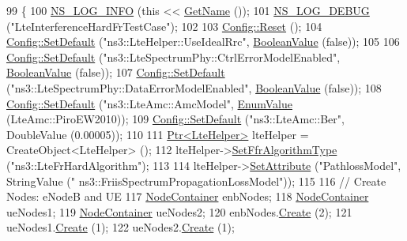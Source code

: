 \begin{DoxyCode}
99 \{
100   \hyperlink{group__logging_gafbd73ee2cf9f26b319f49086d8e860fb}{NS\_LOG\_INFO} (\textcolor{keyword}{this} << \hyperlink{classns3_1_1TestCase_a28f7bb59669c24dae1c290fc17fc9b62}{GetName} ());
101   \hyperlink{group__logging_ga413f1886406d49f59a6a0a89b77b4d0a}{NS\_LOG\_DEBUG} (\textcolor{stringliteral}{"LteInterferenceHardFrTestCase"});
102 
103   \hyperlink{group__config_ga2c1b65724f42f8c72276d7e7ad6df6db}{Config::Reset} ();
104   \hyperlink{group__config_ga2e7882df849d8ba4aaad31c934c40c06}{Config::SetDefault} (\textcolor{stringliteral}{"ns3::LteHelper::UseIdealRrc"}, 
      \hyperlink{classns3_1_1BooleanValue}{BooleanValue} (\textcolor{keyword}{false}));
105 
106   \hyperlink{group__config_ga2e7882df849d8ba4aaad31c934c40c06}{Config::SetDefault} (\textcolor{stringliteral}{"ns3::LteSpectrumPhy::CtrlErrorModelEnabled"}, 
      \hyperlink{classns3_1_1BooleanValue}{BooleanValue} (\textcolor{keyword}{false}));
107   \hyperlink{group__config_ga2e7882df849d8ba4aaad31c934c40c06}{Config::SetDefault} (\textcolor{stringliteral}{"ns3::LteSpectrumPhy::DataErrorModelEnabled"}, 
      \hyperlink{classns3_1_1BooleanValue}{BooleanValue} (\textcolor{keyword}{false}));
108   \hyperlink{group__config_ga2e7882df849d8ba4aaad31c934c40c06}{Config::SetDefault} (\textcolor{stringliteral}{"ns3::LteAmc::AmcModel"}, \hyperlink{classns3_1_1EnumValue}{EnumValue} (LteAmc::PiroEW2010));
109   \hyperlink{group__config_ga2e7882df849d8ba4aaad31c934c40c06}{Config::SetDefault} (\textcolor{stringliteral}{"ns3::LteAmc::Ber"}, DoubleValue (0.00005));
110 
111   \hyperlink{classns3_1_1Ptr}{Ptr<LteHelper>} lteHelper = CreateObject<LteHelper> ();
112   lteHelper->\hyperlink{classns3_1_1LteHelper_a035c6b03305c1511975362f80425b5fc}{SetFfrAlgorithmType} (\textcolor{stringliteral}{"ns3::LteFrHardAlgorithm"});
113 
114   lteHelper->\hyperlink{classns3_1_1ObjectBase_ac60245d3ea4123bbc9b1d391f1f6592f}{SetAttribute} (\textcolor{stringliteral}{"PathlossModel"}, StringValue (\textcolor{stringliteral}{"
      ns3::FriisSpectrumPropagationLossModel"}));
115 
116   \textcolor{comment}{// Create Nodes: eNodeB and UE}
117   \hyperlink{classns3_1_1NodeContainer}{NodeContainer} enbNodes;
118   \hyperlink{classns3_1_1NodeContainer}{NodeContainer} ueNodes1;
119   \hyperlink{classns3_1_1NodeContainer}{NodeContainer} ueNodes2;
120   enbNodes.\hyperlink{classns3_1_1NodeContainer_a787f059e2813e8b951cc6914d11dfe69}{Create} (2);
121   ueNodes1.\hyperlink{classns3_1_1NodeContainer_a787f059e2813e8b951cc6914d11dfe69}{Create} (1);
122   ueNodes2.\hyperlink{classns3_1_1NodeContainer_a787f059e2813e8b951cc6914d11dfe69}{Create} (1);

\end{DoxyCode}
